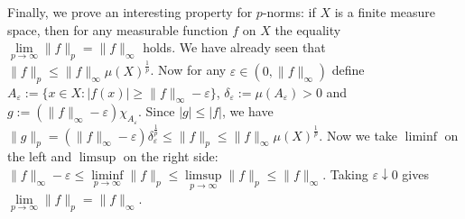 \documentclass[12pt]{article}
\begin{document}
Finally, we prove an interesting property for $p$-norms:
if $X$ is a finite measure space,
then for any measurable function $f$ on $X$
the equality $\lim\limits_{p\to\infty}\|f\|_p=\|f\|_\infty$ holds.
We have already seen that $\|f\|_p\leq\|f\|_\infty\mu(X)^{\frac{1}{p}}$.
Now for any $\varepsilon\in(0,\|f\|_\infty)$
define $A_\varepsilon := \{ x \in X : |f(x)|\geq\|f\|_\infty-\varepsilon \}$,
$\delta_\varepsilon:=\mu(A_\varepsilon)>0$
and $g:=(\|f\|_\infty-\varepsilon)\chi_{A_\varepsilon}$.
Since $|g|\leq|f|$,
we have $\|g\|_p=(\|f\|_\infty-\varepsilon)\delta_\varepsilon^{\frac{1}{p}}\leq\|f\|_p\leq\|f\|_\infty\mu(X)^{\frac{1}{p}}$.
Now we take $\liminf$ on the left and $\limsup$ on the right side:
$\|f\|_\infty-\varepsilon \leq \liminf\limits_{p\to\infty}\|f\|_p \leq \limsup\limits_{p\to\infty}\|f\|_p \leq \|f\|_\infty$.
Taking $\varepsilon\downarrow 0$
gives $\lim\limits_{p\to\infty}\|f\|_p=\|f\|_\infty$.

\end{document}
